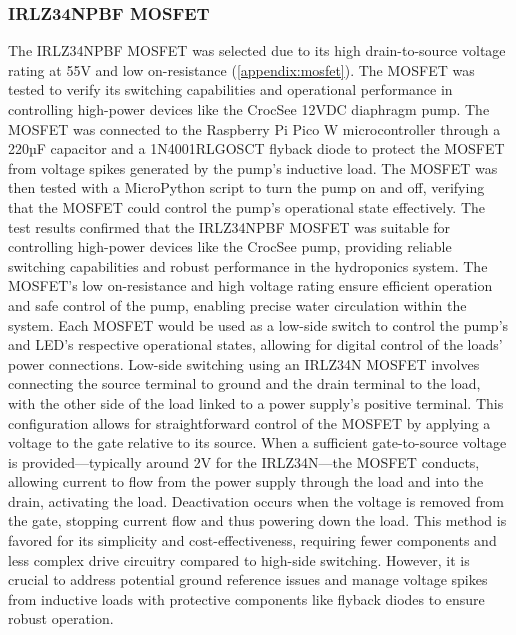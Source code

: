 \documentclass[12pt]{article} %
\begin{document}
\subsubsection{IRLZ34NPBF MOSFET}
\noindent The IRLZ34NPBF MOSFET was selected due to its high drain-to-source voltage rating at 55V and low on-resistance (\ref{appendix:mosfet}). The MOSFET was tested to verify its switching capabilities and operational performance in controlling high-power devices like the CrocSee 12VDC diaphragm pump. The MOSFET was connected to the Raspberry Pi Pico W microcontroller through a 220µF capacitor and a 1N4001RLGOSCT flyback diode to protect the MOSFET from voltage spikes generated by the pump's inductive load. The MOSFET was then tested with a MicroPython script to turn the pump on and off, verifying that the MOSFET could control the pump's operational state effectively. The test results confirmed that the IRLZ34NPBF MOSFET was suitable for controlling high-power devices like the CrocSee pump, providing reliable switching capabilities and robust performance in the hydroponics system. The MOSFET's low on-resistance and high voltage rating ensure efficient operation and safe control of the pump, enabling precise water circulation within the system. Each MOSFET would be used as a low-side switch to control the pump's and LED's respective operational states, allowing for digital control of the loads' power connections.
\newline
\newline
\noindent Low-side switching using an IRLZ34N MOSFET involves connecting the source terminal to ground and the drain terminal to the load, with the other side of the load linked to a power supply's positive terminal. This configuration allows for straightforward control of the MOSFET by applying a voltage to the gate relative to its source. When a sufficient gate-to-source voltage is provided—typically around 2V for the IRLZ34N—the MOSFET conducts, allowing current to flow from the power supply through the load and into the drain, activating the load. Deactivation occurs when the voltage is removed from the gate, stopping current flow and thus powering down the load. This method is favored for its simplicity and cost-effectiveness, requiring fewer components and less complex drive circuitry compared to high-side switching. However, it is crucial to address potential ground reference issues and manage voltage spikes from inductive loads with protective components like flyback diodes to ensure robust operation.
\end{document}
